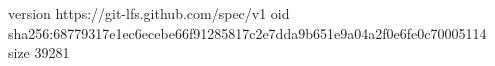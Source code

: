 version https://git-lfs.github.com/spec/v1
oid sha256:68779317e1ec6ecebe66f91285817c2e7dda9b651e9a04a2f0e6fe0c70005114
size 39281
